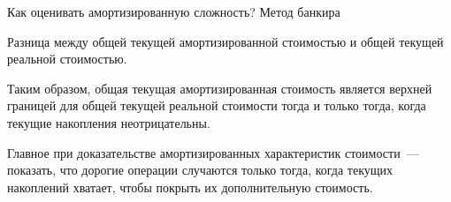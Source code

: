 \begin{frame}{Как оценивать амортизированную сложность? Метод банкира}
\begin{definition}
Разница между общей текущей амортизированной стоимостью
и общей текущей реальной стоимостью. 
\end{definition}
\vspace{2em}
Таким образом, общая
текущая амортизированная стоимость является верхней границей для
общей текущей реальной стоимости тогда и только тогда, когда текущие
накопления неотрицательны.
\vspace{2em}

 Главное при доказательстве
амортизированных характеристик стоимости~--- показать, что дорогие
операции случаются только тогда, когда текущих накоплений хватает,
чтобы покрыть их дополнительную стоимость.

\end{frame}


%



%

